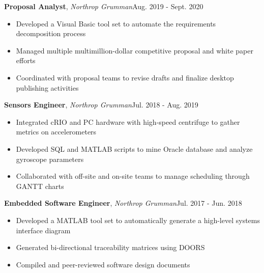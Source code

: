 \documentclass[12pt]{article}
\newcommand\firstboxx[2]{\textbf{\fontsize{12.8}{15}\selectfont #1}, \textit{#2}}
\newcommand{\itemheader}[3]{\firstboxx{#1}{#2}\hfill#3}
\begin{document}
\itemheader{Proposal Analyst}{Northrop Grumman}{Aug. 2019 - Sept. 2020}
\begin{itemize}
\item Developed a Visual Basic tool set to automate the requirements decomposition process
\item Managed multiple multimillion-dollar competitive proposal and white paper efforts
\item Coordinated with proposal teams to revise drafts and finalize desktop publishing activities
\end{itemize}

\bigskip
\itemheader{Sensors Engineer}{Northrop Grumman}{Jul. 2018 - Aug. 2019}
\begin{itemize}
\item Integrated cRIO and PC hardware with high-speed centrifuge to gather metrics on accelerometers
\item Developed SQL and MATLAB scripts to mine Oracle database and analyze gyroscope parameters
\item Collaborated with off-site and on-site teams to manage scheduling through GANTT charts
\end{itemize}

\bigskip
\itemheader{Embedded Software Engineer}{Northrop Grumman}{Jul. 2017 - Jun. 2018}
\begin{itemize}
\item Developed a MATLAB tool set to automatically generate a high-level systems interface diagram 
\item Generated bi-directional traceability matrices using DOORS
\item Compiled and peer-reviewed software design documents
\end{itemize}
\end{document}
